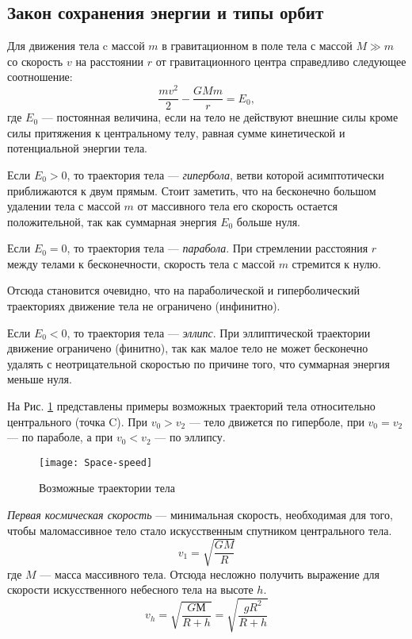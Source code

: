 \subsection{Закон сохранения энергии и типы орбит}
Для движения тела c массой $m$ в гравитационном  в поле тела 
с массой \linebreak $M\gg m$ со скорость $v$ на расстоянии $r$ от 
гравитационного центра справедливо следующее соотношение: 
\begin{equation}
\frac{m v^2}{2}-\frac{GM m }{r}=E_0,
\end{equation}
где $E_0$ --- постоянная величина, если на тело не действуют
внешние силы кроме силы притяжения к центральному телу, 
равная сумме кинетической и потенциальной энергии тела.

Если $E_0>0$, то траектория тела --- {\itshape гипербола}, 
ветви которой асимптотически приближаются к двум прямым. Стоит заметить,
что на бесконечно большом удалении тела с массой $m$ от массивного тела
его скорость остается положительной, так как суммарная энергия $E_0$ 
больше нуля.

Если $E_0=0$, то траектория тела --- {\itshape парабола}. При стремлении
расстояния $r$ между телами к бесконечности, скорость тела с массой $m$ 
стремится к нулю.

Отсюда становится очевидно, что на параболической и гиперболический
 траекториях движение тела не ограничено (инфинитно). 

Если $E_0<0$, то траектория тела --- {\itshape эллипс}. При 
эллиптической траектории движение ограничено (финитно), так как малое тело
не может бесконечно удалять с неотрицательной скоростью по причине того,
что суммарная энергия меньше нуля.



На Рис. \ref{pic:orbits} представлены примеры возможных траекторий тела 
относительно центрального (точка C). При $v_0 > v_{2}$ --- тело движется 
по гиперболе, при $v_0 = v_{2}$ --- по параболе, 
а при $v_0 < v_{2}$ --- по эллипсу.\\

\begin{figure}[h!]
\centering
\texttt{[image: Space-speed]}
\caption{Возможные траектории тела \label{pic:orbits}}
\end{figure}

\textit{Первая космическая скорость} --- минимальная скорость, необходимая для 
того, чтобы маломассивное тело стало искусственным спутником центрального тела.
\begin{equation}v_1=\sqrt{\frac{GM}{R}}
\end{equation}
где $M$ --- масса массивного тела. Отсюда несложно получить выражение для
скорости искусственного небесного тела на высоте 
$h$.\begin{equation}v_h=\sqrt{\frac{GМ}{R+h}}=\sqrt{\frac{gR^2}{R+h}}
\end{equation}\\

